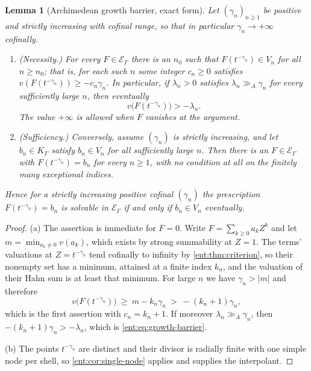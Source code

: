 \documentclass[11pt]{article}
\theoremstyle{plain}
\newtheorem{lemma}[lemma]{Lemma}
\theoremstyle{plain}
\theoremstyle{plain}
\theoremstyle{definition}
\theoremstyle{definition}
\theoremstyle{definition}
\theoremstyle{definition}
\theoremstyle{remark}
\newcommand{\K}{K_\Gamma}\newcommand{\KD}{K_\Delta}
\newcommand{\E}{\mathcal E_\Gamma}
\newcommand{\ggA}{\mathrel{\gg_{\!A}}}
\newcommand{\abs}[1]{\lvert#1\rvert}
\begin{document}
\begin{lemma}[Archimedean growth barrier, exact form]
\label{ent:lem:growth-barrier}
Let $(\gamma_n)_{n\ge1}$ be positive and strictly increasing with cofinal
range, so that in particular $\gamma_n\to+\infty$ cofinally.
\begin{enumerate}[label=\textnormal{(\alph*)},leftmargin=2em]
\item \emph{(Necessity.)} For every $F\in\E$ there is an $n_0$ such that
$F(t^{-\gamma_n})\in V_n$ for all $n\ge n_0$; that is, for each such $n$ some
integer $c_n\ge0$ satisfies $v(F(t^{-\gamma_n}))\ge-c_n\gamma_n$. In
particular, if $\lambda_n>0$ satisfies $\lambda_n\ggA\gamma_n$ for every
sufficiently large $n$, then eventually
\begin{equation}\label{ent:eq:growth-barrier}
 v\bigl(F(t^{-\gamma_n})\bigr)>-\lambda_n .
\end{equation}
The value $+\infty$ is allowed when $F$ vanishes at the argument.
\item \emph{(Sufficiency.)} Conversely, assume $(\gamma_n)$ is strictly
increasing, and let $b_n\in\K$ satisfy $b_n\in V_n$ for all sufficiently
large $n$. Then there is an $F\in\E$ with $F(t^{-\gamma_n})=b_n$ for every
$n\ge1$, with no condition at all on the finitely many exceptional indices.
\end{enumerate}
Hence for a strictly increasing positive cofinal $(\gamma_n)$ the prescription
$F(t^{-\gamma_n})=b_n$ is solvable in $\E$ if and only if $b_n\in V_n$
eventually.
\end{lemma}
\begin{proof}
(a) The assertion is immediate for $F=0$. Write $F=\sum_{k\ge0}a_kZ^k$ and let
$m=\min_{a_k\ne0}v(a_k)$, which exists by strong summability at $Z=1$. The
terms' valuations at $Z=t^{-\gamma_n}$ tend cofinally to infinity by
\cref{ent:thm:criterion}, so their nonempty set has a minimum, attained at a
finite index $k_n$, and the valuation of their Hahn sum is at least that
minimum. For large $n$ we have $\gamma_n>\abs m$ and therefore
\[
 v\bigl(F(t^{-\gamma_n})\bigr)\ \ge\ m-k_n\gamma_n\ >\ -(k_n+1)\gamma_n ,
\]
which is the first assertion with $c_n=k_n+1$. If moreover
$\lambda_n\ggA\gamma_n$, then $-(k_n+1)\gamma_n>-\lambda_n$, which is
\eqref{ent:eq:growth-barrier}.

(b) The points $t^{-\gamma_n}$ are distinct and their divisor is radially
finite with one simple node per shell, so
\cref{ent:cor:single-node} applies and supplies the interpolant.
\end{proof}
\end{document}
